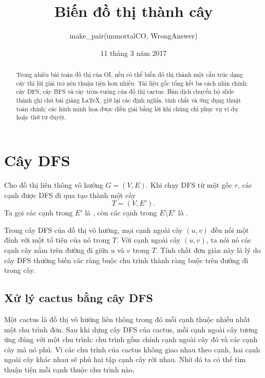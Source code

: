 \documentclass[11pt]{article}
\title{Biến đồ thị thành cây}
\author{make\_pair(immortalCO, WrongAnswer)}
\date{11 tháng 3 năm 2017}
\begin{document}
\maketitle


\begin{abstract}
Trong nhiều bài toán đồ thị của OI, nếu có thể biến đồ thị thành một cấu trúc
dạng cây thì lời giải trở nên thuận tiện hơn nhiều. Tài liệu gốc tổng kết ba
cách nhìn chính: cây DFS, cây BFS và cây tròn-vuông của đồ thị cactus. Bản
dịch chuyển bộ slide thành ghi chú bài giảng LaTeX, giữ lại các định nghĩa,
tính chất và ứng dụng thuật toán chính; các hình minh họa được diễn giải bằng
lời khi chúng chỉ phục vụ ví dụ hoặc thứ tự duyệt.
\end{abstract}

\tableofcontents

\section{Cây DFS}

Cho đồ thị liên thông vô hướng \(G=(V,E)\). Khi chạy DFS từ một gốc \(r\), các
cạnh được DFS đi qua tạo thành một cây
\[
  T=(V,E').
\]
Ta gọi các cạnh trong \(E'\) là , còn các cạnh trong
\(E\setminus E'\) là .

Trong cây DFS của đồ thị vô hướng, mọi cạnh ngoài cây \((u,v)\) đều nối một
đỉnh với một tổ tiên của nó trong \(T\). Với cạnh ngoài cây \((u,v)\), ta nói
nó  các cạnh cây nằm trên đường đi giữa \(u\) và \(v\) trong \(T\).
Tính chất đơn giản này là lý do cây DFS thường biến các ràng buộc chu trình
thành ràng buộc trên đường đi trong cây.

\subsection{Xử lý cactus bằng cây DFS}

Một cactus là đồ thị vô hướng liên thông trong đó mỗi cạnh thuộc nhiều nhất
một chu trình đơn. Sau khi dựng cây DFS của cactus, mỗi cạnh ngoài cây tương
ứng đúng với một chu trình: chu trình gồm chính cạnh ngoài cây đó và các cạnh
cây mà nó phủ. Vì các chu trình của cactus không giao nhau theo cạnh, hai cạnh
ngoài cây khác nhau sẽ phủ hai tập cạnh cây rời nhau. Nhờ đó ta có thể tìm
thuận tiện mỗi cạnh thuộc chu trình nào.
\end{document}
